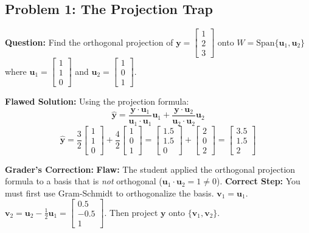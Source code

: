 \documentclass[11pt, letterpaper]{article}
\theoremstyle{definition}
\theoremstyle{remark}
\begin{document}
\subsection{Problem 1: The Projection Trap}
\textbf{Question:} Find the orthogonal projection of $\mathbf{y} = \begin{bmatrix} 1 \\ 2 \\ 3 \end{bmatrix}$ onto $W = \text{Span}\{\mathbf{u}_1, \mathbf{u}_2\}$ where $\mathbf{u}_1 = \begin{bmatrix} 1 \\ 1 \\ 0 \end{bmatrix}$ and $\mathbf{u}_2 = \begin{bmatrix} 1 \\ 0 \\ 1 \end{bmatrix}$.

\textbf{Flawed Solution:}
Using the projection formula:
\[ \hat{\mathbf{y}} = \frac{\mathbf{y} \cdot \mathbf{u}_1}{\mathbf{u}_1 \cdot \mathbf{u}_1}\mathbf{u}_1 + \frac{\mathbf{y} \cdot \mathbf{u}_2}{\mathbf{u}_2 \cdot \mathbf{u}_2}\mathbf{u}_2 \]
\[ \hat{\mathbf{y}} = \frac{3}{2}\begin{bmatrix} 1 \\ 1 \\ 0 \end{bmatrix} + \frac{4}{2}\begin{bmatrix} 1 \\ 0 \\ 1 \end{bmatrix} = \begin{bmatrix} 1.5 \\ 1.5 \\ 0 \end{bmatrix} + \begin{bmatrix} 2 \\ 0 \\ 2 \end{bmatrix} = \begin{bmatrix} 3.5 \\ 1.5 \\ 2 \end{bmatrix} \]

\textbf{Grader's Correction:}
\textbf{Flaw:} The student applied the orthogonal projection formula to a basis that is \textit{not} orthogonal ($\mathbf{u}_1 \cdot \mathbf{u}_2 = 1 \neq 0$).
\textbf{Correct Step:} You must first use Gram-Schmidt to orthogonalize the basis. $\mathbf{v}_1 = \mathbf{u}_1$. $\mathbf{v}_2 = \mathbf{u}_2 - \frac{1}{2}\mathbf{u}_1 = \begin{bmatrix} 0.5 \\ -0.5 \\ 1 \end{bmatrix}$. Then project $\mathbf{y}$ onto $\{\mathbf{v}_1, \mathbf{v}_2\}$.
\end{document}
